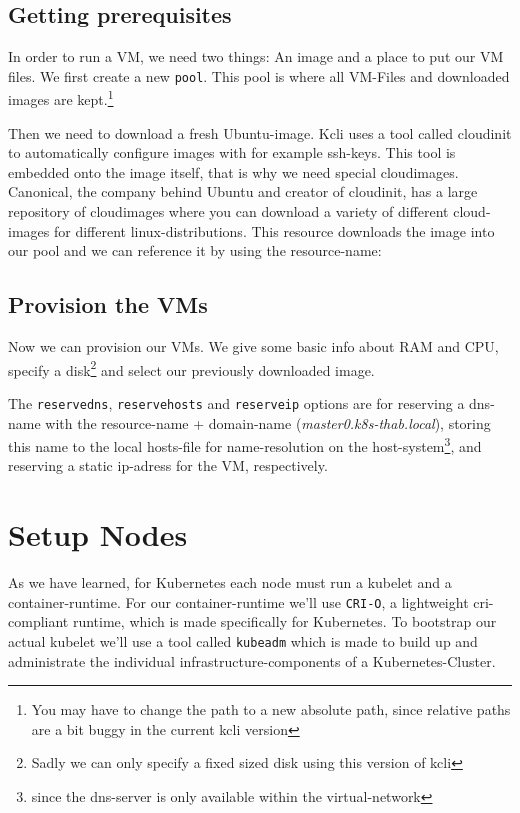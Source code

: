 \subsection{Getting prerequisites}
In order to run a VM, we need two things: An image and a place to put our VM files. 
We first create a new \texttt{pool}. This pool is where all VM-Files and downloaded images are kept.\footnote{You may have to change the path to a new absolute path, since relative paths are a bit buggy in the current kcli version}

Then we need to download a fresh Ubuntu-image. Kcli uses a tool called cloudinit to automatically configure images with for example ssh-keys. This tool is embedded onto the image itself, that is why we need special cloudimages. Canonical, the company behind Ubuntu and creator of cloudinit, has a large repository of cloudimages where you can download a variety of different cloud-images for different linux-distributions. This resource downloads the image into our pool and we can reference it by using the resource-name:

\subsection{Provision the VMs}
Now we can provision our VMs. We give some basic info about RAM and CPU, specify a disk\footnote{Sadly we can only specify a fixed sized disk using this version of kcli} and select our previously downloaded image.

The \texttt{reservedns}, \texttt{reservehosts} and \texttt{reserveip} options are for reserving a dns-name with the resource-name + domain-name (\textit{master0.k8s-thab.local}), storing this name to the local hosts-file for name-resolution on the host-system\footnote{since the dns-server is only available within the virtual-network}, and reserving a static ip-adress for the VM, respectively. 

\section{Setup Nodes}
As we have learned, for Kubernetes each node must run a kubelet and a container-runtime. For our container-runtime we'll use \texttt{CRI-O}, a lightweight cri-compliant runtime, which is made specifically for Kubernetes.
To bootstrap our actual kubelet we'll use a tool called \texttt{kubeadm} which is made to build up and administrate the individual infrastructure-components of a Kubernetes-Cluster.

